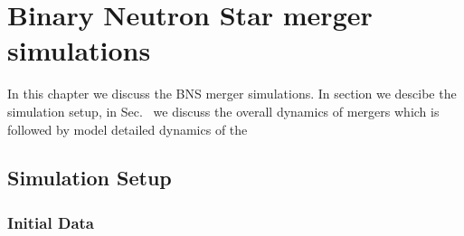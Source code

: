 \chapter{Binary Neutron Star merger simulations} %

\label{ch:bns_sims} %

In this chapter we discuss the \ac{BNS} merger simulations.
In section  we descibe the simulation setup, in 
Sec.~ we discuss the overall dynamics of mergers which 
is followed by model detailed dynamics of the 





\section{Simulation Setup} \label{sec:bns_sims:setup}


\subsection{Initial Data}


